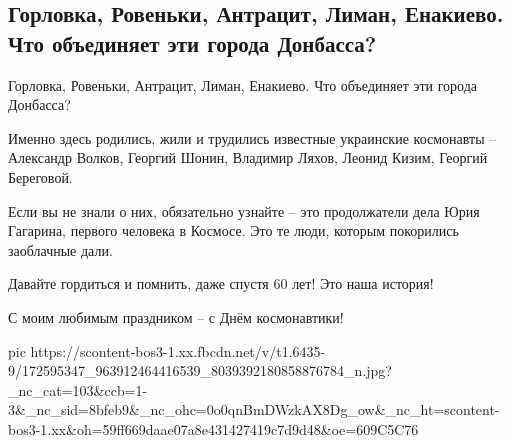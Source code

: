  
 
 
 
 
\subsection{Горловка, Ровеньки, Антрацит, Лиман, Енакиево. Что объединяет эти города Донбасса?}
\label{sec:12_04_2021.fb.sivoho_sergej.1.kosmonavty_donbass}

Горловка, Ровеньки, Антрацит, Лиман, Енакиево. Что объединяет эти города Донбасса? 

Именно здесь родились, жили и трудились известные украинские космонавты –
Александр Волков, Георгий Шонин, Владимир Ляхов, Леонид Кизим, Георгий
Береговой. 

Если вы не знали о них, обязательно узнайте – это продолжатели дела Юрия
Гагарина, первого человека в Космосе. Это те люди, которым покорились
заоблачные дали.

Давайте гордиться и помнить, даже спустя 60 лет! Это наша история!

С моим любимым праздником – с Днём космонавтики!

\ifcmt
  pic https://scontent-bos3-1.xx.fbcdn.net/v/t1.6435-9/172595347_963912464416539_8039392180858876784_n.jpg?_nc_cat=103&ccb=1-3&_nc_sid=8bfeb9&_nc_ohc=0o0qnBmDWzkAX8Dg_ow&_nc_ht=scontent-bos3-1.xx&oh=59ff669daae07a8e431427419c7d9d48&oe=609C5C76
\fi

